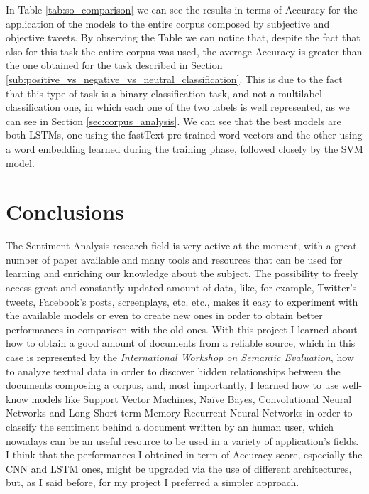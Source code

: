 \documentclass[11pt,twocolumn]{article}
\begin{document}
            \noindent
            In Table \ref{tab:so_comparison} we can see the results in terms of Accuracy for the application
            of the models to the entire corpus composed by subjective and objective tweets. By observing the
            Table we can notice that, despite the fact that also for this task the entire corpus was used,
            the average Accuracy is greater than the one obtained for the task described in Section
            \ref{sub:positive_vs_negative_vs_neutral_classification}. This is due to the fact that this
            type of task is a binary classification task, and not a multilabel classification one, in which
            each one of the two labels is well represented, as we can see in Section
            \ref{sec:corpus_analysis}. We can see that the best models are both LSTMs, one using the
            fastText pre-trained word vectors and the other using a word embedding learned during the
            training phase, followed closely by the SVM model.

    \section{Conclusions} %
    \label{sec:conclusions}
        The Sentiment Analysis research field is very active at the moment, with a great number of paper
        available and many tools and resources that can be used for learning and enriching our knowledge
        about
        the subject. The possibility to freely access great and constantly updated amount of data, like, for
        example, Twitter's tweets, Facebook's posts, screenplays, etc. etc., makes it easy to experiment
        with the available models or even to create new ones in order to obtain better performances in
        comparison with the old ones. With this project I learned about how to obtain a good amount of
        documents from a reliable source, which in this case is represented by the
        \textit{International Workshop on Semantic Evaluation}, how to analyze textual data in order to
        discover hidden relationships between the documents composing a corpus, and, most importantly, I
        learned how to use well-know models like Support Vector Machines, Naïve Bayes, Convolutional Neural
        Networks and Long Short-term Memory Recurrent Neural Networks in order to classify the sentiment
        behind a document written by an human user, which nowadays can be an useful resource to be used
        in a variety of application's fields. I think that the performances I obtained in term of Accuracy
        score, especially the CNN and LSTM ones, might be upgraded via the use of different architectures,
        but, as I said before, for my project I preferred a simpler approach.
\end{document}
